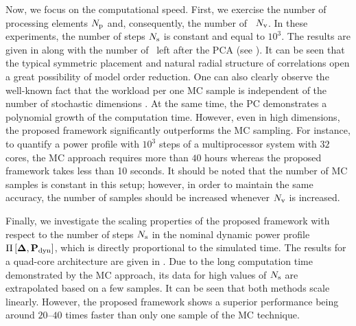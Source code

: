 
Now, we focus on the computational speed. First, we exercise the number of processing elements ${N_\text{p}}$ and, consequently, the number of \rvs\ ${N_\text{v}}$. In these experiments, the number of steps $N_\text{s}$ is constant and equal to $10^3$. The results are given in  along with the number of \rvs\ left after the PCA (see ). It can be seen that the typical symmetric placement and natural radial structure of correlations \cite{cheng2011} open a great possibility of model order reduction. One can also clearly observe the well-known fact that the workload per one MC sample is independent of the number of stochastic dimensions \cite{maitre2010}. At the same time, the PC demonstrates a polynomial growth \cite{heiss2008} of the computation time. However, even in high dimensions, the proposed framework significantly outperforms the MC sampling. For instance, to quantify a power profile with $10^3$ steps of a multiprocessor system with $32$ cores, the MC approach requires more than $40$ hours whereas the proposed framework takes less than 10 seconds. It should be noted that the number of MC samples is constant in this setup; however, in order to maintain the same accuracy, the number of samples should be increased whenever ${N_\text{v}}$ is increased.

Finally, we investigate the scaling properties of the proposed framework with respect to the number of steps $N_\text{s}$ in the nominal dynamic power profile $\prof{\mP_\dyn}$, which is directly proportional to the simulated time. The results for a quad-core architecture are given in . Due to the long computation time demonstrated by the MC approach, its data for high values of $N_\text{s}$ are extrapolated based on a few samples. It can be seen that both methods scale linearly. However, the proposed framework shows a superior performance being around $20$--$40$ times faster than only one sample of the MC technique.
